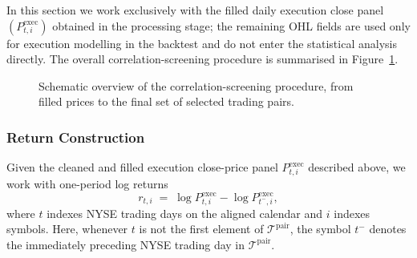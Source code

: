 \documentclass[11pt,a4paper]{article}
\begin{document}
In this section we work exclusively with the filled daily execution close panel
\((P^{\mathrm{exec}}_{t,i})\) obtained in the processing stage; the remaining
OHL fields are used only for execution modelling in the backtest and do not
enter the statistical analysis directly. The overall correlation-screening
procedure is summarised in Figure~\ref{fig:corr-pipeline}.

\begin{figure}[t]
  \centering
  \caption{Schematic overview of the correlation-screening procedure, from filled prices to the final set of selected trading pairs.}
  \label{fig:corr-pipeline}
\end{figure}
\subsubsection{Return Construction}

Given the cleaned and filled execution close-price panel
\(P^{\mathrm{exec}}_{t,i}\) described above, we work with one-period log returns
\[
  r_{t,i} \;=\; \log P^{\mathrm{exec}}_{t,i} - \log P^{\mathrm{exec}}_{t^{-},i},
\]
where \(t\) indexes NYSE trading days on the aligned calendar and \(i\) indexes
symbols. Here, whenever \(t\) is not the first element of
\(\mathcal{T}^{\mathrm{pair}}\), the symbol \(t^{-}\) denotes the immediately
preceding NYSE trading day in \(\mathcal{T}^{\mathrm{pair}}\).
\end{document}

